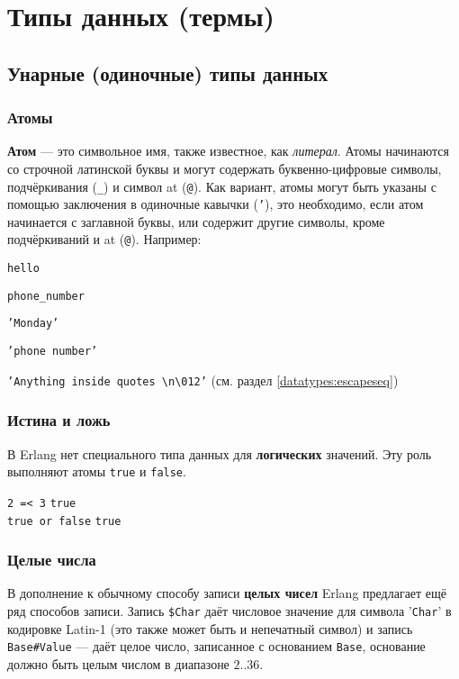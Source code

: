\chapter{Типы данных (термы)}
\label{datatypes}


\section{Унарные (одиночные) типы данных}


\subsection{Атомы}
\label{datatypes:atom}
\textbf{Атом} --- это символьное имя, также известное, как \textit{литерал}.
Атомы начинаются со строчной латинской буквы и могут содержать буквенно-цифровые
символы, подчёркивания (\texttt{\_}) и символ at (\texttt{@}).
Как вариант, атомы могут быть указаны с помощью заключения в одиночные кавычки
(\texttt{'}), это необходимо, если атом начинается с заглавной буквы, или содержит
другие символы, кроме подчёркиваний и at (\texttt{@}). Например:

\texttt{hello}

\texttt{phone\_number}

\texttt{'Monday'}

\texttt{'phone number'}

\texttt{'Anything inside quotes \textbackslash n\textbackslash 012'}
\hfill(см. раздел \ref{datatypes:escapeseq})


\subsection{Истина и ложь}
\label{datatypes:boolean}
В Erlang нет специального типа данных для \textbf{логических} значений. Эту роль
выполняют атомы \texttt{true} и \texttt{false}.

\texttt{2 =< 3} \resultingin \texttt{true} \\
\texttt{true or false} \resultingin \texttt{true}


\subsection{Целые числа}
\label{datatypes:integer}

В дополнение к обычному способу записи \textbf{целых чисел} Erlang предлагает
ещё ряд способов записи. Запись \texttt{\$Char} даёт числовое значение для 
символа '\texttt{Char}' в кодировке Latin-1 (это также может быть и непечатный
символ) и запись \texttt{Base\#Value} --- даёт целое число, записанное с 
основанием \texttt{Base}, основание должно быть целым числом в диапазоне $2..36$.

